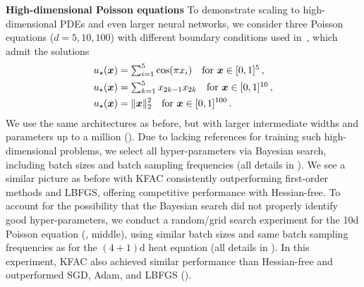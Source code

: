 \textbf{High-dimensional Poisson equations}
To demonstrate scaling to high-dimensional PDEs and even larger neural networks, we consider three Poisson equations ($d=5,10,100$) with different boundary conditions used in~\cite{yu2018deep, muller2023achieving}, which admit the solutions
\begin{align}\label{eq:solutions_poisson}
  \begin{split}
    u_\star({\bm{x}})
    &=
      \textstyle
      \sum_{i=1}^5 \cos(\pi x_i) \quad \text{for } {\bm{x}}\in [0,1]^{5}\,,
    \\
    u_\star({\bm{x}})
    &=
      \textstyle
      \sum_{k=1}^5 x_{2k-1}x_{2k}  \quad \text{for } {\bm{x}}\in [0,1]^{10}\,,
    \\
    u_\star({\bm{x}})
    &=
      \lVert {\bm{x}} \rVert_2^2 \quad \text{for } {\bm{x}}\in [0,1]^{100}\,.
  \end{split}
\end{align}
We use the same architectures as before, but with larger intermediate widths and parameters up to a million ().
Due to lacking references for training such high-dimensional problems, we select all hyper-parameters via Bayesian search, including batch sizes and batch sampling frequencies (all details in ).
We see a similar picture as before with KFAC consistently outperforming first-order methods and LBFGS, offering competitive performance with Hessian-free.
To account for the possibility that the Bayesian search did not properly identify good hyper-parameters, we conduct a random/grid search experiment for the 10d Poisson equation (, middle), using similar batch sizes and same batch sampling frequencies as for the $(4+1)$d heat equation (all details in ).
In this experiment, KFAC also achieved similar performance than Hessian-free and outperformed SGD, Adam, and LBFGS ().

